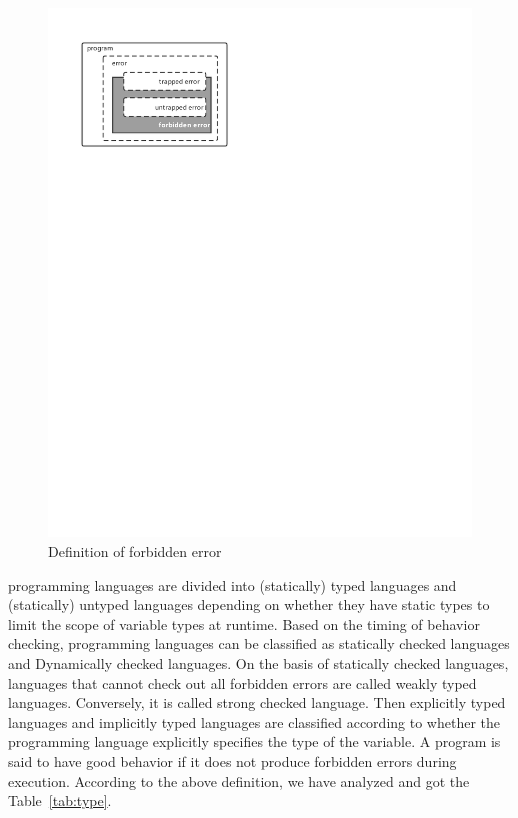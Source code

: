 \begin{figure}[htbp]
    \centerline{\includegraphics[scale=0.8]{figures/type-definition}}
    \caption{Definition of forbidden error}
    \label{fig:type-definition}
\end{figure}



programming languages are divided into (statically) typed languages and (statically) untyped languages
depending on whether they have static types to limit the scope of variable types at runtime.
Based on the timing of behavior checking, programming languages
can be classified as statically checked languages and Dynamically checked languages.
On the basis of statically checked languages, languages that cannot check out
all forbidden errors are called weakly typed languages.
Conversely, it is called strong checked language.
Then explicitly typed languages and implicitly typed languages are
classified according to whether the programming language explicitly
specifies the type of the variable.
A program is said to have good behavior if it does not produce
forbidden errors during execution.
According to the above definition,
we have analyzed and got the Table~\ref{tab:type}.

